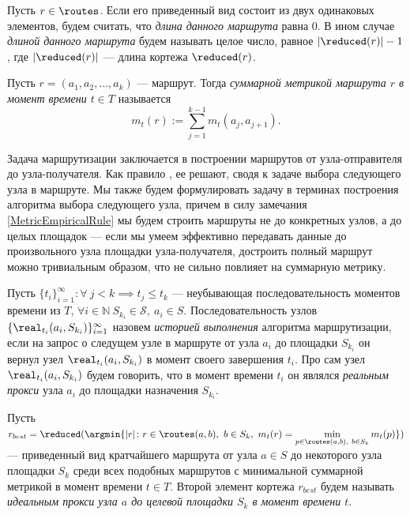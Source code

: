 \begin{definition}
    Пусть $r \in \routes$. Если его приведенный вид состоит из двух одинаковых элементов, будем считать, что \textit{длина данного маршрута} равна 0. В ином случае \textit{длиной данного маршрута} будем называть целое число, равное $|\reduced(r)| - 1$, где $|\reduced(r)|$ --- длина кортежа $\reduced(r)$.
\end{definition}

\begin{definition}
\label{RouteMetricDefinition}
    Пусть $r = (a_1, a_2, \ldots, a_k)$ --- маршрут. Тогда \textit{суммарной метрикой маршрута $r$ в момент времени $t \in T$} называется 
    \[
        m_t(r) := \displaystyle \sum_{j = 1}^{k - 1} m_t(a_{j}, a_{j + 1}).
    \]
\end{definition}

Задача маршрутизации заключается в построении маршрутов от узла-отправителя до узла-получателя. Как правило \cite{RFC2328, RFC2453}, ее решают, сводя к задаче выбора следующего узла в маршруте. Мы также будем формулировать задачу в терминах построения алгоритма выбора следующего узла, причем в силу замечания \ref{MetricEmpiricalRule} мы будем строить маршруты не до конкретных узлов, а до целых площадок --- если мы умеем эффективно передавать данные до произвольного узла площадки узла-получателя, достроить полный маршрут можно тривиальным образом, что не сильно повлияет на суммарную метрику.

\begin{definition}
    Пусть $\{t_i\}_{i = 1}^{\infty} \colon \forall\ j < k \implies t_j \leq t_k$ --- неубывающая последовательность моментов времени из $T$, $\forall i \in \mathbb{N}\ S_{k_i} \in \mathcal{S},\ a_i \in S$. Последовательность узлов $\{\real_{t_i}(a_i, S_{k_i})\}_{i = 1}^{\infty}$ назовем \textit{историей выполнения} алгоритма маршрутизации, если на запрос о следущем узле в маршруте от узла $a_i$ до площадки $S_{k_i}$ он вернул узел $\real_{t_i}(a_i, S_{k_i})$ в момент своего завершения $t_i$. Про сам узел $\real_{t_i}(a_i, S_{k_i})$ будем говорить, что в момент времени $t_i$ он являлся \textit{реальным прокси} узла $a_i$ до площадки назначения $S_{k_i}$.
\end{definition}

\begin{definition}
\label{IdealProxyDefinition}
    Пусть $r_{best} = \reduced( \argmin \{ |r| \colon r \in \routes(a,b),\ b \in S_k,\ m_t(r) = \displaystyle \min_{p \in \routes(a,b),\ b \in S_k} m_t(p) \} )$ --- приведенный вид кратчайшего маршрута от узла $a \in S$ до некоторого узла площадки $S_k$ среди всех подобных маршрутов с минимальной суммарной метрикой в момент времени $t \in T$. Второй элемент кортежа $r_{best}$ будем называть \textit{идеальным прокси узла $a$ до целевой площадки $S_k$ в момент времени $t$}.
\end{definition}

